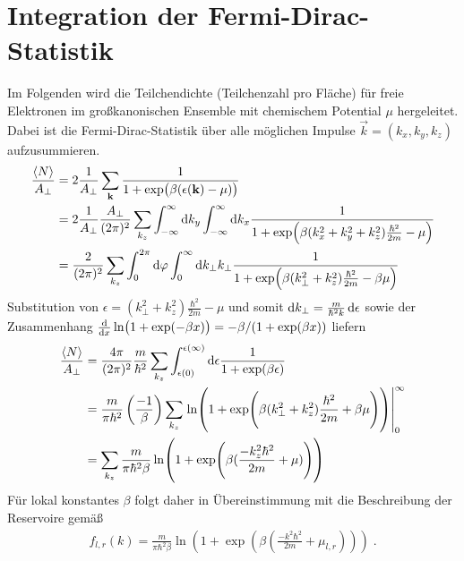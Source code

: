 \chapter{Integration der Fermi-Dirac-Statistik}
\label{sec:A_2}
Im Folgenden wird die Teilchendichte (Teilchenzahl pro Fläche) für freie Elektronen im großkanonischen Ensemble mit chemischem Potential $\mu$ hergeleitet. Dabei ist die Fermi-Dirac-Statistik über alle möglichen Impulse $\vec{k}=(k_x,k_y,k_z)$ aufzusummieren.
\begin{align}
  \frac{\expval{N}}{A_{\perp}} &= 2\frac{1}{A_{\perp}}\sum_{\vb{k}}\frac{1}{1+\exp(\beta(\epsilon(\vb{k}) - \mu))} \\
    &= 2\frac{1}{A_{\perp}}  \frac{A_{\perp}}{(2\pi)^2} \sum_{k_z}\int_{-\infty}^{\infty} \mathop{}\!\mathrm{d} k_y \int_{-\infty}^{\infty} \mathop{}\!\mathrm{d} k_x \frac{1}{1+\exp(\beta(k_x^2 + k_y^2 + k_z^2)\frac{\hbar^2}{2m} - \mu)} \\
    &= \frac{2}{(2\pi)^2} \sum_{k_z} \int_0^{2\pi} \mathop{}\!\mathrm{d} \varphi \int_0^{\infty} \mathop{}\!\mathrm{d} k_{\perp} k_{\perp} \frac{1}{1+\exp(\beta(k_{\perp}^2 + k_z^2)\frac{\hbar^2}{2m} - \beta \mu)}
\end{align}
Substitution von $\epsilon = (k^2_{\perp} + k_z^2)\frac{\hbar^2}{2m} - \mu$ und somit $\mathop{}\!\mathrm{d} k_\perp = \frac{m}{\hbar^2 k}\mathop{}\!\mathrm{d} \epsilon$ sowie der Zusammenhang $\frac{\mathrm{d}}{\mathrm{d}x}\ln(1+\exp(-\beta x)) = -\beta / (1+\exp(\beta x))$ liefern
\begin{align}
  \frac{\expval{N}}{A_{\perp}} &= \frac{4\pi}{(2\pi)^2} \frac{m}{\hbar^2} \sum_{k_z} \int_{\epsilon(0)}^{{\epsilon(\infty)}} \mathop{}\!\mathrm{d} \epsilon \frac{1}{1+\exp(\beta\epsilon)} \\
    &= \frac{m}{\pi\hbar^2}\left( \frac{-1}{\beta}\right) \sum_{k_z} \left.\ln(1+\exp(\beta(k_{\perp}^2 + k_z^2)\frac{\hbar^2}{2m} + \beta\mu))\right|_0^{\infty} \\
    &= \sum_{k_z} \frac{m}{\pi\hbar^2\beta} \ln(1+\exp(\beta(\frac{- k_z^2\hbar^2}{2m} + \mu)))
\end{align}
Für lokal konstantes $\beta$ folgt daher in Übereinstimmung mit \cite{frensley2} die Beschreibung der Reservoire gemäß
\begin{align}
  f_{l,r} (k) = \frac{m}{\pi\hbar^2\beta} \ln(1+\exp(\beta(\frac{- k^2\hbar^2}{2m} + \mu_{l,r}))) \; .
\end{align}
